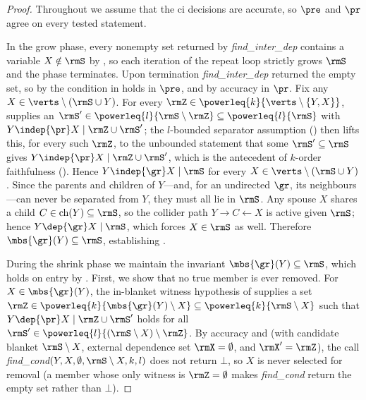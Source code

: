 \algkomb*
\begin{proof}
  Throughout we assume that the \gls{ci} decisions are accurate, so
  $\pre$ and $\pr$ agree on every tested statement.

  In the grow phase, every nonempty set returned by
  \textit{find\_inter\_dep} contains a variable $X\notin\rmS$ by
  , so each iteration of the repeat loop strictly
  grows $\rmS$ and the phase terminates. Upon termination
  \textit{find\_inter\_dep} returned the empty set, so by
   the condition in  holds in
  $\pre$, and by accuracy in $\pr$. Fix any
  $X\in\verts\setminus(\rmS\cup Y)$. For every
  $\rmZ\in\powerleq{k}{\verts\setminus\{Y,X\}}$, 
  supplies an $\rmS'\in\powerleq{l}{\rmS\setminus\rmZ}
  \subseteq\powerleq{l}{\rmS}$ with $Y\indep{\pr}X\mid\rmZ\cup\rmS'$;
  the $l$-bounded separator assumption () then
  lifts this, for every such $\rmZ$, to the unbounded statement that
  some $\rmS'\subseteq\rmS$ gives $Y\indep{\pr}X\mid\rmZ\cup\rmS'$,
  which is the antecedent of $k$-order faithfulness
  (). Hence $Y\indep{\gr}X\mid\rmS$ for every
  $X\in\verts\setminus(\rmS\cup Y)$. Since the parents and children of
  $Y$---and, for an undirected $\gr$, its neighbours---can never be
  separated from $Y$, they must all lie in $\rmS$. Any spouse $X$
  shares a child $C\in\text{ch}(Y)\subseteq\rmS$, so the collider path
  $Y\rightarrow C\leftarrow X$ is active given $\rmS$; hence
  $Y\dep{\gr}X\mid\rmS$, which forces $X\in\rmS$ as well. Therefore
  $\mbs{\gr}(Y)\subseteq\rmS$, establishing .

  During the shrink phase we maintain the invariant
  $\mbs{\gr}(Y)\subseteq\rmS$, which holds on entry by .
  First, we show that no true member is ever removed. For
  $X\in\mbs{\gr}(Y)$, the in-blanket witness hypothesis of
   supplies a set
  $\rmZ\in\powerleq{k}{\mbs{\gr}(Y)\setminus X}
  \subseteq\powerleq{k}{\rmS\setminus X}$ such that
  $Y\dep{\pr}X\mid\rmZ\cup\rmS'$ holds for all
  $\rmS'\in\powerleq{l}{(\rmS\setminus X)\setminus\rmZ}$. By accuracy and 
  (with candidate blanket $\rmS\setminus X$, external dependence set
  $\rmX=\emptyset$, and $\rmX'=\rmZ$), the call
  \textit{find\_cond}$(Y,X,\emptyset,\rmS\setminus X,k,l)$ does not
  return $\bot$, so $X$ is never selected for removal (a member whose
  only witness is $\rmZ=\emptyset$ makes \textit{find\_cond} return the
  empty set rather than $\bot$).


\end{proof}
